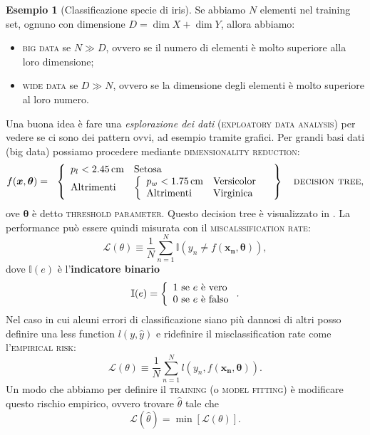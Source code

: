 \documentclass[10pt]{article}
\renewcommand{\vec}[1]{\boldsymbol{#1}}
\newcommand{\im}[1]{\textsc{#1}}
\theoremstyle{definition}
\newtheorem{example}{Esempio}[section]
\theoremstyle{definition}
\begin{document}
\begin{example}[Classificazione specie di iris]
Se abbiamo $N$ elementi nel training set, ognuno con dimensione $D = \dim{X} + \dim{Y}$, allora abbiamo:
\begin{itemize}
\item \im{big data} se $N\gg D$, ovvero se il numero di elementi è molto superiore alla loro dimensione;
\item \im{wide data} se $D\gg N$, ovvero se la dimensione degli elementi è molto superiore al loro numero.
\end{itemize}

Una buona idea è fare una \textit{esplorazione dei dati} (\im{exploatory data analysis}) per vedere se ci sono dei pattern ovvi, ad esempio tramite grafici. Per grandi basi dati (big data) possiamo procedere mediante \im{dimensionality reduction}:
\begin{equation}
f(\vec{x}, \vec{\theta}) = \left.\begin{array}{l}
\left\{\begin{array}{ll}
p_l < \qty{2.45}{cm} & \text{Setosa} \\
\text{Altrimenti} & \left\{\begin{array}{ll}
p_w < \qty{1.75}{cm} & \text{Versicolor} \\
\text{Altrimenti} & \text{Virginica} \\
\end{array}\right.
\end{array}\right.
\end{array}\right\} \quad\text{\im{decision tree}},
\end{equation}
ove $\vec{\theta}$ è detto \im{threshold parameter}. Questo decision tree è visualizzato in . La performance può essere quindi misurata con il \im{miscalssification rate}:
\begin{equation}
\mathcal{L}(\theta) \equiv \frac{1}{N}\sum_{n=1}^N \mathbb{I}\left( y_n \neq f(\vec{x_n}, \vec{\theta}) \right),
\end{equation}
dove $\mathbb{I}(e)$ è l'\textbf{indicatore binario}
\begin{equation}
\mathbb{I}(e) = \left\{\begin{array}{l@{\text{ se } e \text{ è }}l}
1 & \text{vero} \\
0 & \text{falso} \\
\end{array}\right..
\end{equation}
Nel caso in cui alcuni errori di classificazione siano più dannosi di altri posso definire una less function $l(y, \hat{y})$ e ridefinire il misclassification rate come l'\im{empirical risk}:
\begin{equation}
\mathcal{L}(\theta) \equiv \frac{1}{N}\sum_{n=1}^N l\left( y_n, f(\vec{x_n}, \vec{\theta}) \right).
\end{equation}
Un modo che abbiamo per definire il \im{training} (o \im{model fitting}) è modificare questo rischio empirico, ovvero trovare $\hat{\theta}$ tale che
\begin{equation}
\mathcal{L}(\hat{\theta}) = \min[\mathcal{L}(\theta)].
\end{equation}


\end{example}
\end{document}
